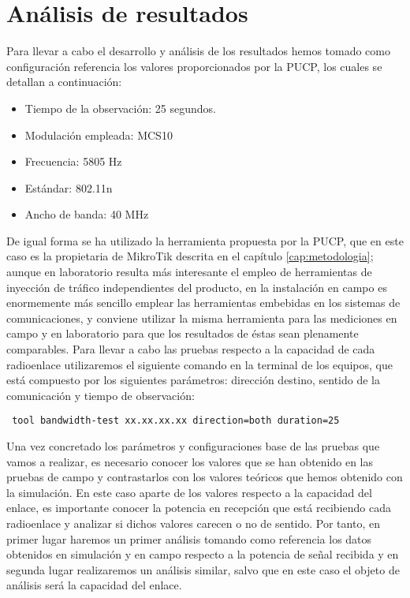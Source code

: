 \section{Análisis de resultados}
Para llevar a cabo el desarrollo y análisis de los resultados hemos tomado como configuración referencia los valores proporcionados por la PUCP, los cuales se detallan a continuación:
\begin{itemize}
	\item Tiempo de la observación: 25 segundos.
	\item Modulación empleada: MCS10
	\item Frecuencia: 5805 Hz
	\item Estándar: 802.11n
	\item Ancho de banda: 40 MHz
\end{itemize}
De igual forma se ha utilizado la herramienta propuesta por la PUCP, que en este caso es la propietaria de MikroTik descrita en el capítulo \ref{cap:metodologia}; aunque en laboratorio resulta más interesante el empleo de herramientas de inyección de tráfico independientes del producto, en la instalación en campo es enormemente más sencillo emplear las herramientas embebidas en los sistemas de comunicaciones, y conviene utilizar la misma herramienta para las mediciones en campo y en laboratorio para que los resultados de éstas sean plenamente comparables. Para llevar a cabo las pruebas respecto a la capacidad de cada radioenlace  utilizaremos el siguiente comando en la terminal de los equipos, que está compuesto por los siguientes parámetros: dirección destino, sentido de la comunicación y tiempo de observación:
\begin{lstlisting}
 tool bandwidth-test xx.xx.xx.xx direction=both duration=25
\end{lstlisting}

Una vez concretado los parámetros y configuraciones base de las pruebas que vamos a realizar, es necesario conocer los valores que se han obtenido en las pruebas de campo y contrastarlos con los valores teóricos que hemos obtenido con la simulación. En este caso aparte de los valores respecto a la capacidad del enlace, es importante conocer la potencia en recepción que está recibiendo cada radioenlace y analizar si dichos valores carecen o no de sentido. Por tanto, en primer lugar haremos un primer análisis tomando como referencia los datos obtenidos en simulación y en campo respecto a la potencia de señal recibida y en segunda lugar realizaremos un análisis similar, salvo que en este caso el objeto de análisis será la capacidad del enlace.\\

